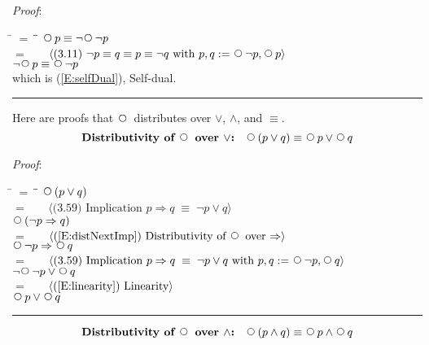 \documentclass[12pt, fleqn, leqno]{article}
\newcommand{\lgap}{2pt}                             %
\newcommand{\mymathindent}{24pt}                    %
\newcommand{\equivs}{\ensuremath{\;\equiv\;}}       %
\newcommand{\impl}{\ensuremath{\Rightarrow}}        %
\newcommand{\Next}{\;\,\text{\raisebox{3.5pt}{\circle{6}}}}
\newcommand{\myqed}{\rule[-.23ex]{1.2ex}{2.0ex}}
\newcommand{\myqedtab}{\hspace{384pt}}              %
\newcommand{\Gll} {\langle}                         %
\newcommand{\Ggg} {\rangle}                         %
\newcommand{\Hint}[1]     {\ \ \ $\Gll              \mbox{#1} \Ggg$ }   %
\begin{document}
\emph{Proof}:
\begin{tabbing}
\hspace{\mymathindent} \= $= \;$ \= \myqedtab \= \kill
  \> \>   $\Next p \equiv \neg\Next\neg p$\\[\lgap]
  \> $=$  \>  \Hint{(3.11) $\neg p \equiv q \equiv p \equiv \neg q$ with $p,q := \Next\neg p, \Next p$} \\[\lgap]
  \> \>   $\neg\Next p \equiv \Next\neg p$ \\[\lgap]
  \> which is (\ref{E:selfDual}), Self-dual. \quad \myqed
\end{tabbing}

Here are proofs that $\Next$ distributes over $\lor$, $\land$, and $\equiv$.
\begin{equation}\label{E:distNextOr}
\textbf{Distributivity of $\Next$ over $\lor$:}\quad \Next (p \lor q) \equiv \Next p \lor \Next q
\end{equation}

\emph{Proof}:
\begin{tabbing}
\hspace{\mymathindent} \= $= \;$ \= \myqedtab \= \kill
	\> \>   $\Next(p \lor q)$\\[\lgap]
	\> $=$  \>  \Hint{(3.59) Implication $p\impl q \equivs \neg p \lor q$}\\[\lgap]
	\> \>   $\Next(\neg p \impl q)$\\[\lgap]
	\> $=$  \>  \Hint{(\ref{E:distNextImp}) Distributivity of $\Next$ over $\impl$}\\[\lgap]
	\> \>   $\Next\neg p \impl \Next q$\\[\lgap]
	\> $=$  \>  \Hint{(3.59) Implication $p\impl q \equivs \neg p \lor q$ with $p,q := \Next\neg p, \Next q$}\\[\lgap]
	\> \>   $\neg\Next\neg p \lor \Next q$\\[\lgap]
	\> $=$  \>  \Hint{(\ref{E:linearity}) Linearity}\\[\lgap]
	\> \>   $\Next p \lor \Next q$ \quad \myqed
\end{tabbing}
\begin{equation}\label{E:distNextAnd}
\textbf{Distributivity of $\Next$ over $\land$:}\quad \Next (p \land q) \equiv \Next p \land \Next q
\end{equation}
\end{document}
